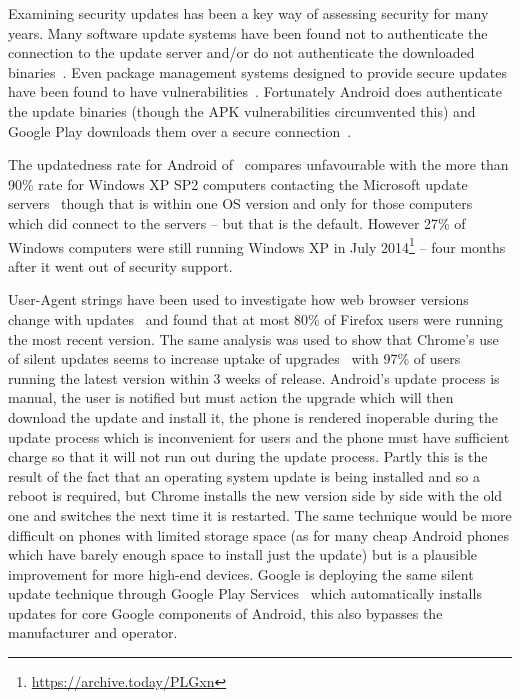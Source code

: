 \documentclass[conference,a4paper,twoside]{IEEEtran}
\let\OldTodo\todo
\renewcommand{\todo}{\OldTodo[inline]}
\newcommand{\todolater}[1]{}%
\begin{document}
Examining security updates has been a key way of assessing security for many years.
Many software update systems have been found not to authenticate the connection to the update server and/or do not authenticate the downloaded binaries~\cite{Bellissimo2006}.
Even package management systems designed to provide secure updates have been found to have vulnerabilities~\cite{Cappos2008}.
Fortunately Android does authenticate the update binaries (though the APK vulnerabilities circumvented this) and Google Play downloads them over a secure connection~\cite{Viennot2014}. \todolater{double check that}

The updatedness rate for Android of \daUpdatednessPerc\ compares unfavourable with the more than 90\% rate for Windows XP SP2 computers contacting the Microsoft update servers~\cite{Gkantsidis2006} though that is within one OS version and only for those computers which did connect to the servers -- but that is the default.
However 27\% of Windows computers were still running Windows XP in July 2014\footnote{\url{https://archive.today/PLGxn}\todolater{Get updated figures before publication}} -- four months after it went out of security support.

User-Agent strings have been used to investigate how web browser versions change with updates~\cite{Frei2008} and found that at most 80\% of Firefox users were running the most recent version.
The same analysis was used to show that Chrome's use of silent updates seems to increase uptake of upgrades~\cite{Duebendorfer2010} with 97\% of users running the latest version within 3 weeks of release.
Android's update process is manual, the user is notified but must action the upgrade which will then download the update and install it, the phone is rendered inoperable during the update process which is inconvenient for users and the phone must have sufficient charge so that it will not run out during the update process.
Partly this is the result of the fact that an operating system update is being installed and so a reboot is required, but Chrome installs the new version side by side with the old one and switches the next time it is restarted.
The same technique would be more difficult on phones with limited storage space (as for many cheap Android phones which have barely enough space to install just the update) but is a plausible improvement for more high-end devices.
Google is deploying the same silent update technique through Google Play Services~\cite{TODO} which automatically installs updates for core Google components of Android, this also bypasses the manufacturer and operator.
\end{document}
